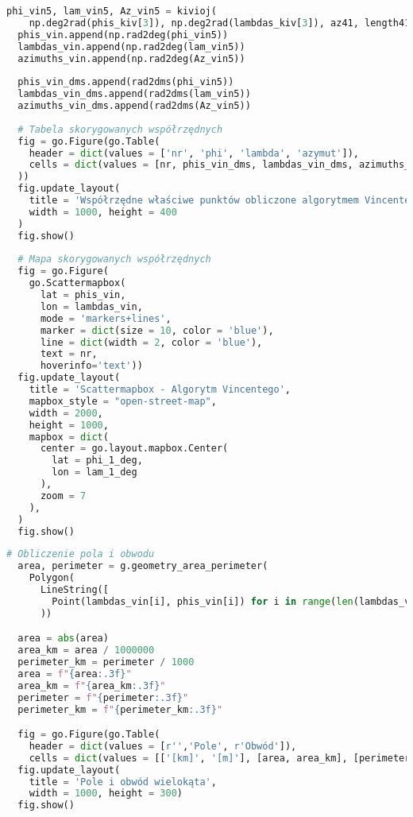 \documentclass[fleqn,10pt,a4paper]{article}
\begin{document}
\begin{lstlisting}[language=Python, caption = Algortym Vincentego, label = kod:vincenty, style = mycode]
  phi_vin5, lam_vin5, Az_vin5 = kivioj(
    np.deg2rad(phis_kiv[3]), np.deg2rad(lambdas_kiv[3]), az41, length41)
  phis_vin.append(np.rad2deg(phi_vin5))
  lambdas_vin.append(np.rad2deg(lam_vin5))
  azimuths_vin.append(np.rad2deg(Az_vin5))
  
  phis_vin_dms.append(rad2dms(phi_vin5))
  lambdas_vin_dms.append(rad2dms(lam_vin5))
  azimuths_vin_dms.append(rad2dms(Az_vin5))
  
  # Tabela skorygowanych współrzędnych
  fig = go.Figure(go.Table(
    header = dict(values = ['nr', 'phi', 'lambda', 'azymut']), 
    cells = dict(values = [nr, phis_vin_dms, lambdas_vin_dms, azimuths_vin_dms])
  ))
  fig.update_layout(
    title = 'Współrzędne właściwe punktów obliczone algorytmem Vincentego', 
    width = 1000, height = 400
  )
  fig.show()
  
  # Mapa skorygowanych współrzędnych
  fig = go.Figure(
    go.Scattermapbox(
      lat = phis_vin,
      lon = lambdas_vin,
      mode = 'markers+lines',
      marker = dict(size = 10, color = 'blue'),
      line = dict(width = 2, color = 'blue'),
      text = nr,
      hoverinfo='text'))
  fig.update_layout(
    title = 'Scattermapbox - Algorytm Vincentego',
    mapbox_style = "open-street-map",
    width = 2000, 
    height = 1000,
    mapbox = dict(
      center = go.layout.mapbox.Center(
        lat = phi_1_deg,
        lon = lam_1_deg
      ),
      zoom = 7
    ),
  )
  fig.show()

\end{lstlisting}

\begin{lstlisting}[language=Python, caption = Pole i obwód figury, label = kod:pole, style = mycode]
  # Obliczenie pola i obwodu
  area, perimeter = g.geometry_area_perimeter(
    Polygon(
      LineString([
        Point(lambdas_vin[i], phis_vin[i]) for i in range(len(lambdas_vin))])
      ))

  area = abs(area)
  area_km = area / 1000000
  perimeter_km = perimeter / 1000
  area = f"{area:.3f}"
  area_km = f"{area_km:.3f}"
  perimeter = f"{perimeter:.3f}"
  perimeter_km = f"{perimeter_km:.3f}"

  fig = go.Figure(go.Table(
    header = dict(values = [r'','Pole', r'Obwód']), 
    cells = dict(values = [['[km]', '[m]'], [area, area_km], [perimeter, perimeter_km]])))
  fig.update_layout(
    title = 'Pole i obwód wielokąta', 
    width = 1000, height = 300)
  fig.show()
\end{lstlisting}

\newpage
\listoftables
\listoffigures
\lstlistoflistings
\end{document}
